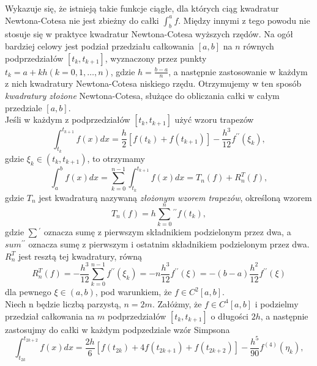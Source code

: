 \documentclass{article}
\begin{document}
Wykazuje się, że istnieją takie funkcje ciągłe, dla których ciąg kwadratur Newtona-Cotesa nie jest
zbieżny do całki $\int_b^a f$. Między innymi z tego powodu nie stosuje się w praktyce kwadratur Newtona-Cotesa wyższych
rzędów. Na ogół bardziej celowy jest podział przedziału całkowania $[a, b]$ na $n$ równych podprzedziałów
$[t_k, t_{k+1}]$, wyznaczony przez punkty $t_k = a + kh (k = 0, 1, \ldots , n)$, gdzie $h = \frac{b - a}{n}$, a następnie
zastosowanie w każdym z nich kwadratury Newtona-Cotesa niskiego rzędu. Otrzymujemy w ten sposób
\emph{kwadratury złożone} Newtona-Cotesa, służące do obliczania całki w całym przedziale $[a, b]$.\\
Jeśli w każdym z podprzedziałów $[t_k, t_{k+1}]$ użyć wzoru trapezów
\begin{equation*}
	\int_{t_k}^{t_{k + 1}} f(x) dx = \frac{h}{2}[f(t_k) + f(t_{k + 1})] - \frac{h^3}{12} f^{\prime\prime}(\xi_k),
\end{equation*}
gdzie $\xi_k \in (t_k,t_{k + 1})$, to otrzymamy
\begin{equation*}
	\int_a^b f(x) dx = \sum_{k = 0}^{n - 1} \int_{t_k}^{t_{k + 1}} f(x) dx = T_n(f) + R_n^T(f),
\end{equation*}
gdzie $T_n$ jest kwadraturą nazywaną \emph{złożonym wzorem trapezów}, określoną wzorem
\begin{equation*}
	T_n(f) = h {\sum_{k = 0}^n} {}^{\prime\prime} f(t_k),
\end{equation*}
gdzie $\sum {}^{\prime}$ oznacza sumę z pierwszym składnikiem podzielonym przez dwa, a $
sum {}^{\prime\prime}$ oznacza sumę z pierwszym i ostatnim składnikiem podzielonym przez dwa. \\
$R_n^T$ jest resztą tej kwadratury, równą
\begin{equation*}
	R_n^T(f) = -\frac{h^3}{12} \sum_{k = 0}^{n - 1} f^{\prime\prime}(\xi_k) = - n \frac{h^3}{12} f^{\prime\prime} (\xi) = -(b - a)\frac{h^2}{12} f^{\prime\prime} (\xi)
\end{equation*}
dla pewnego $\xi \in (a,b)$, pod warunkiem, że $f \in C^2[a,b]$.\\
Niech n będzie liczbą parzystą, $n = 2m$. Załóżmy, że $f \in C^4[a,b]$ i podzielmy przedział całkowania
na $m$ podprzedziałów $[t_k, t_{k + 1}]$ o długości $2h$, a następnie zastosujmy do całki w każdym
podpzedziale wzór Simpsona
\begin{equation*}
	\int_{t_{2k}}^{t_{2k + 2}} f(x) dx = \frac{2h}{6}[f(t_{2k}) + 4 f(t_{2k + 1}) + f(t_{2k + 2})] - \frac{h^5}{90} f^{(4)} (\eta_k),
\end{equation*}
\end{document}
